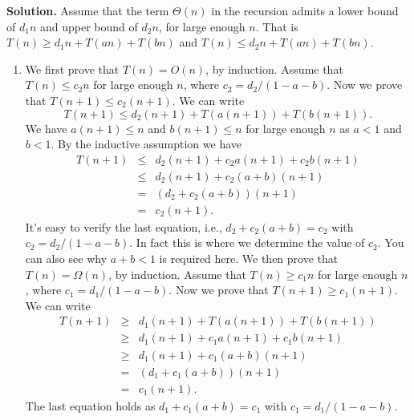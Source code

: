 \documentclass[11pt]{article}
\begin{document}
\begin{qunlist}
{\bf Solution.} Assume that the term $\Theta(n)$ in the recursion admits a lower bound of $d_1 n$ and upper bound of $d_2 n$, for large enough $n$.
That is $T(n) \ge d_1n + T(an) + T(bn)$ and $T(n) \le d_2n + T(an) + T(bn)$.

\begin{enumerate}
\item
We first prove that $T(n) = O(n)$, by induction.
Assume that $T(n) \le c_2n$ for large enough $n$, where $c_2 = d_2/(1-a-b)$.
Now we prove that $T(n + 1) \le c_2(n+1)$.
We can write
$$T(n + 1) \le d_2(n+1) + T(a(n+1)) + T(b(n+1)).$$
We have $a(n+1) \le n$ and $b(n+1) \le n$ for large enough $n$ as $a < 1$ and $b < 1$.
By the inductive assumption we have
\begin{eqnarray*}
T(n + 1) & \le & d_2(n+1) + c_2a(n+1) + c_2b(n+1) \\
	      & \le & d_2(n+1) + c_2(a+b)(n+1) \\
	      & =   & (d_2 + c_2(a+b))(n+1) \\
		  & =   & c_2(n+1).
\end{eqnarray*}
It's easy to verify the last equation, i.e., $d_2 + c_2(a+b) = c_2$ with $c_2 = d_2 / (1 - a - b)$.
In fact this is where we determine the value of $c_2$. You can also see why
$a + b < 1$ is required here.
We then prove that $T(n) = \Omega(n)$, by induction.
Assume that $T(n) \ge c_1n$ for large enough $n$, where $c_1 = d_1/(1-a-b)$.
Now we prove that $T(n + 1) \ge c_1(n+1)$.
We can write
\begin{eqnarray*}
T(n + 1) &\ge & d_1(n+1) + T(a(n+1)) + T(b(n+1)) \\
          & \ge & d_1(n+1) + c_1a(n+1) + c_1b(n+1) \\
	      & \ge & d_1(n+1) + c_1(a+b)(n+1) \\
	      & =   & (d_1 + c_1(a+b))(n+1) \\
		  & =   & c_1(n+1).
\end{eqnarray*}
The last equation holds as $d_1 + c_1(a+b) = c_1$ with $c_1 = d_1 / (1 - a - b)$.


\end{enumerate}
\end{qunlist}
\end{document}
